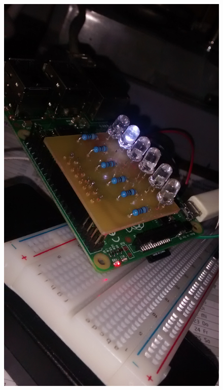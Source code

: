 \documentclass{article}
\begin{document}
\begin{figure}[H]
\includegraphics[height=0.27\textheight]{led/vista5}

\end{figure}
\end{document}
